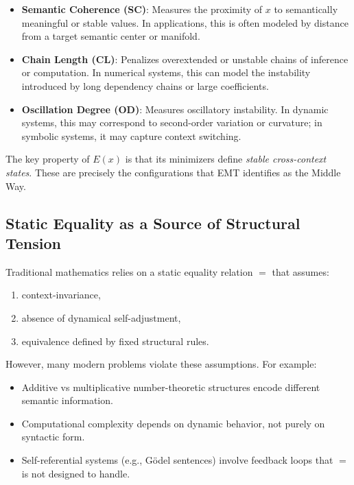 \documentclass[11pt]{article}
\theoremstyle{definition}
\theoremstyle{remark}
\begin{document}
\begin{itemize}
    \item \textbf{Semantic Coherence (SC)}:
    Measures the proximity of $x$ to semantically meaningful or
    stable values. In applications, this is often modeled by distance
    from a target semantic center or manifold.

    \item \textbf{Chain Length (CL)}:
    Penalizes overextended or unstable chains of inference or
    computation. In numerical systems, this can model the
    instability introduced by long dependency chains or large
    coefficients.

    \item \textbf{Oscillation Degree (OD)}:
    Measures oscillatory instability. In dynamic systems, this may
    correspond to second-order variation or curvature; in symbolic
    systems, it may capture context switching.
\end{itemize}

The key property of $E(x)$ is that its minimizers define \emph{stable
cross-context states}. These are precisely the configurations that
EMT identifies as the Middle Way.

\subsection{Static Equality as a Source of Structural Tension}

Traditional mathematics relies on a static equality relation $=$ that
assumes:

\begin{enumerate}
    \item context-invariance,
    \item absence of dynamical self-adjustment,
    \item equivalence defined by fixed structural rules.
\end{enumerate}

However, many modern problems violate these assumptions. For example:

\begin{itemize}
    \item Additive vs multiplicative number-theoretic structures
          encode different semantic information.
    \item Computational complexity depends on dynamic behavior,
          not purely on syntactic form.
    \item Self-referential systems (e.g., G\"odel sentences)
          involve feedback loops that $=$ is not designed to handle.
\end{itemize}
\end{document}
